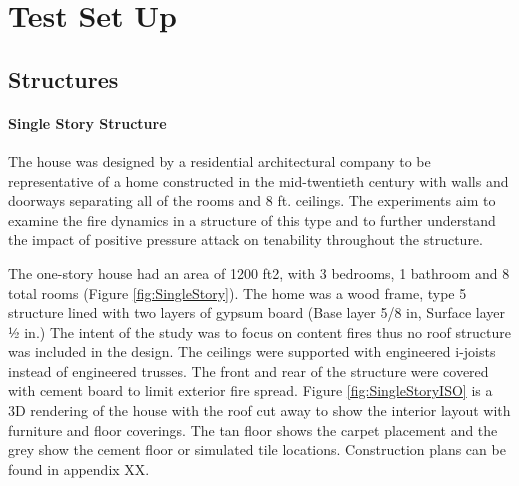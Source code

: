 \documentclass{article}
\begin{document}
\section{Test Set Up}

\subsection{Structures}

\paragraph{Single Story Structure} \mbox{}

The house was designed by a residential architectural company to be representative of a home constructed in the mid-twentieth century with walls and doorways separating all of the rooms and 8 ft. ceilings. The experiments aim to examine the fire dynamics in a structure of this type and to further understand the impact of positive pressure attack on tenability throughout the structure.

The one-story house had an area of 1200 ft2, with 3 bedrooms, 1 bathroom and 8 total rooms (Figure \ref{fig:SingleStory}). The home was a wood frame, type 5 structure lined with two layers of gypsum board (Base layer 5/8 in, Surface layer ½ in.) The intent of the study was to focus on content fires thus no roof structure was included in the design. The ceilings were supported with engineered i-joists instead of engineered trusses. The front and rear of the structure were covered with cement board to limit exterior fire spread. Figure \ref{fig:SingleStoryISO} is a 3D rendering of the house with the roof cut away to show the interior layout with furniture and floor coverings. The tan floor shows the carpet placement and the grey show the cement floor or simulated tile locations. Construction plans can be found in appendix XX.
\end{document}
